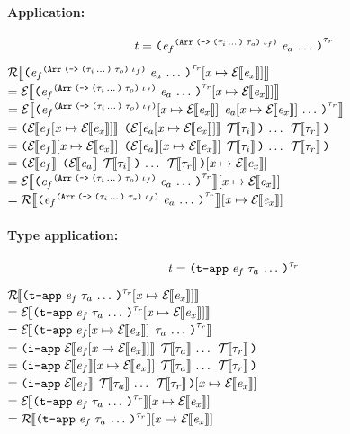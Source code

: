 \begin{sproof}
\paragraph{Application:}
\[\term =\notedapp[\type_r]
{\annotate
  [\typearray{\typefun{\sequence{\type_i}}{\type_o}}{\idx_f}]
  {\expr_f}}
{\sequence{\expr_a}}\]
$\EraseTrm{\eexprsubst{\notedapp[\type_r]{\annotate
      [\typearray{\typefun{\sequence{\type_i}}{\type_o}}{\idx_f}]
      {\expr_f}}
    {\sequence{\expr_a}}}}$ \\
$= \EraseE{\eexprsubst{\notedapp[\type_r]{\annotate
      [\typearray{\typefun{\sequence{\type_i}}{\type_o}}{\idx_f}]
      {\expr_f}}
    {\sequence{\expr_a}}}}$ \\
$= \EraseE{\notedapp[\type_r]{\eexprsubst{\annotate
      [\typearray{\typefun{\sequence{\type_i}}{\type_o}}{\idx_f}]
      {\expr_f}}}
  {\sequence{\eexprsubst{\expr_a}}}}$ \\
$= \app
{\EraseE{\eexprsubst{\expr_f}}}
{\sequence{\ttsexp{\EraseE{\eexprsubst{\expr_a}}}{\EraseT{\type_i}}}\;\EraseT{\type_r}}$ \\
$= \app
{\exprsubstE{\expr_f}}
{\sequence{\ttsexp{\exprsubstE{\expr_a}}{\EraseT{\type_i}}}\;\EraseT{\type_r}}$ \\
$= \eexprsubst{\app
  {\EraseE{\expr_f}}
  {\sequence{\ttsexp{\EraseE{\expr_a}}{\EraseT{\type_i}}}\;\EraseT{\type_r}}}$ \\
$= \exprsubstE{\notedapp[\type_r]
  {\annotate
    [\typearray{\typefun{\sequence{\type_i}}{\type_o}}{\idx_f}]
    {\expr_f}}
  {\sequence{\expr_a}}}$ \\
$= \etrmsubstE{\notedapp[\type_r]
  {\annotate
    [\typearray{\typefun{\sequence{\type_i}}{\type_o}}{\idx_f}]
    {\expr_f}}
  {\sequence{\expr_a}}}$ \\

\paragraph{Type application:}
\[\term = \notedtapp[\type_r]{\expr_f}{\sequence{\type_a}}\]
$\EraseTrm{\eexprsubst{\notedtapp[\type_r]{\expr_f}{\sequence{\type_a}}}}$ \\
$= \EraseE{\eexprsubst{\notedtapp[\type_r]{\expr_f}{\sequence{\type_a}}}}$ \\
$= \EraseE{\notedtapp[\type_r]{\eexprsubst{\expr_f}}{\sequence{\type_a}}}$ \\
$= \iapp{\EraseE{\eexprsubst{\expr_f}}}{\sequence{\EraseT{\type_a}}\;\EraseT{\type_r}}$ \\
$= \iapp{\exprsubstE{\expr_f}}{\sequence{\EraseT{\type_a}}\;\EraseT{\type_r}}$ \\
$= \eexprsubst{\iapp{\EraseE{\expr_f}}{\sequence{\EraseT{\type_a}}\;\EraseT{\type_r}}}$ \\
$= \exprsubstE{\notedtapp[\type_r]{\expr_f}{\sequence{\type_a}}}$ \\
$= \etrmsubstE{\notedtapp[\type_r]{\expr_f}{\sequence{\type_a}}}$ \\


\end{sproof}

